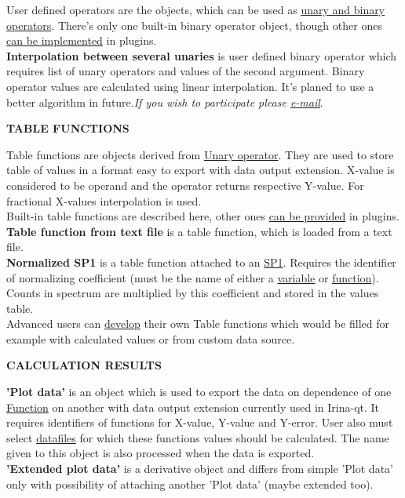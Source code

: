 \documentclass[a4paper]{article}
\begin{document}
{
User defined operators are the objects, which can be used as \hyperlink{function}{unary and binary operators}. 
There's only one built-in binary operator object, though other ones \hyperlink{devtool}{can be implemented} in plugins.
\\
\textbf{Interpolation between several unaries} is user defined binary operator which requires list of {unary operators} and values of the second argument. Binary operator values are calculated using linear interpolation.
It's planed to use a better algorithm in future.\textit{If you wish to participate please \hyperlink{contacts}{e-mail}}.
}
\hypertarget{tablefunc}{\\}
\begin{center}\textbf{TABLE FUNCTIONS}\end{center}
{
Table functions are objects derived from \hyperlink{userbinary}{Unary operator}. 
They are used to store table of values in a format easy to export with data output extension. 
X-value is considered to be operand and the operator returns respective Y-value.
For fractional X-values interpolation is used.
\\
Built-in table functions are described here, other ones \hyperlink{devtool}{can be provided} in plugins.
\hypertarget{tablefunctxt}{\\}
\textbf{Table function from text file} is a table function, which is loaded from a text file.
\hypertarget{sp1norm}{\\}
\textbf{Normalized SP1} is a table function attached to an \hyperlink{sp1}{SP1}.
Requires the identifier of normalizing coefficient (must be the name of either a \hyperlink{variable}{variable} or \hyperlink{function}{function}). 
Counts in spectrum are multiplied by this coefficient and stored in the values table.
\\
Advanced users can \hyperlink{devtool}{develop} their own Table functions which would be filled for example with calculated values or from custom data source.
}
%
\hypertarget{scatter}{\\}
\begin{center}\textbf{{CALCULATION RESULTS}}\end{center}
{
\textbf{'Plot data'} is an object which is used to export the data on dependence of one \hyperlink{function}{Function} on another with data output extension currently used in Irina-qt.
It requires identifiers of functions for X-value, Y-value and Y-error. 
User also must select \hyperlink{datafile}{datafiles} for which these functions values should be calculated.
The name given to this object is also processed when the data is exported. 
\hypertarget{scattertagged}{\\}
\textbf{'Extended plot data'} is a derivative object and differs from simple 'Plot data' only with possibility of attaching another 'Plot data' (maybe extended too).
}
\end{document}
